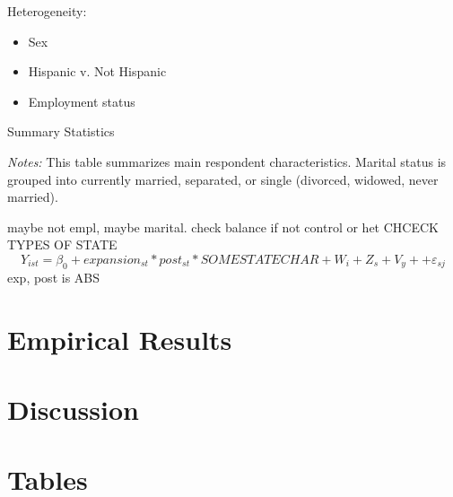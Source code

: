\documentclass{article}
\begin{document}
Heterogeneity:
\begin{itemize}
    \item Sex
    \item Hispanic v. Not Hispanic
    \item Employment status
\end{itemize}




\begin{table}[h!]
\begin{centering}
\singlespacing
\caption{Summary Statistics}
\label{tab:sumstat}
\end{centering}
\begin{spacing}{1}
\begin{footnotesize}

\textit{Notes:} This table summarizes main respondent characteristics. Marital status is grouped into currently married, separated, or single (divorced, widowed, never married).
\end{footnotesize}
\end{spacing}
\end{table}

maybe not empl, maybe marital. check balance if not control or het
CHCECK TYPES OF STATE 
\begin{equation}
    Y_{ist} = \beta_0 + expansion_{st}*post_{st}*SOME STATE CHAR+  W_{i} + Z_{s} + V_{y}+ + \varepsilon_{sj}
\end{equation}
exp, post is ABS 

\section{Empirical Results}


\section{Discussion}


\newpage


\newpage
\section{Tables}
\end{document}
